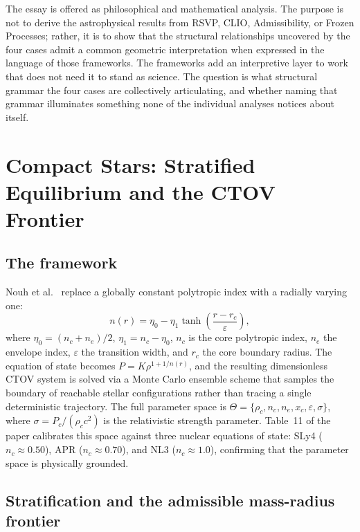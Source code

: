 \documentclass[12pt, oneside]{article}
\begin{document}
The essay is offered as philosophical and mathematical analysis. The purpose is not to derive the astrophysical results from RSVP, CLIO, Admissibility, or Frozen Processes; rather, it is to show that the structural relationships uncovered by the four cases admit a common geometric interpretation when expressed in the language of those frameworks. The frameworks add an interpretive layer to work that does not need it to stand as science. The question is what structural grammar the four cases are collectively articulating, and whether naming that grammar illuminates something none of the individual analyses notices about itself.

\section{Compact Stars: Stratified Equilibrium and the CTOV Frontier}

\subsection{The framework}

Nouh et al.~\cite{nouh2026} replace a globally constant polytropic index with a radially varying one:
\begin{equation}
n(r) = \eta_0 - \eta_1 \tanh\!\left(\frac{r - r_c}{\varepsilon}\right),
\end{equation}
where $\eta_0 = (n_c + n_e)/2$, $\eta_1 = n_c - \eta_0$, $n_c$ is the core polytropic index, $n_e$ the envelope index, $\varepsilon$ the transition width, and $r_c$ the core boundary radius. The equation of state becomes $P = K\rho^{1+1/n(r)}$, and the resulting dimensionless CTOV system is solved via a Monte Carlo ensemble scheme that samples the boundary of reachable stellar configurations rather than tracing a single deterministic trajectory. The full parameter space is $\Theta = \{\rho_c, n_c, n_e, x_c, \varepsilon, \sigma\}$, where $\sigma = P_c/(\rho_c c^2)$ is the relativistic strength parameter. Table~11 of the paper calibrates this space against three nuclear equations of state: SLy4 ($n_c \approx 0.50$), APR ($n_c \approx 0.70$), and NL3 ($n_c \approx 1.0$), confirming that the parameter space is physically grounded.

\subsection{Stratification and the admissible mass-radius frontier}
\end{document}
